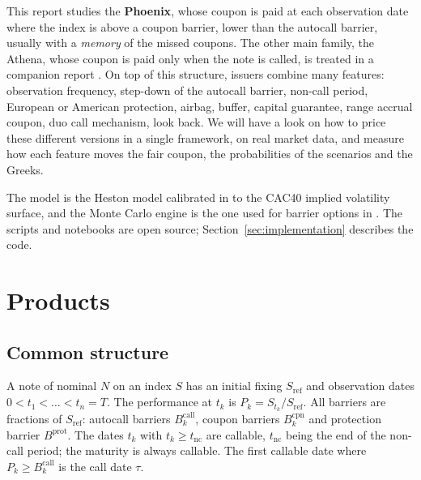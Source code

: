 \documentclass[11pt,a4paper]{article}
\newcommand{\Sref}{S_{\mathrm{ref}}}
\begin{document}
This report studies the \textbf{Phoenix}, whose coupon is paid at each observation date where the index is above a
coupon barrier, lower than the autocall barrier, usually with a \emph{memory} of the missed coupons. The other main
family, the Athena, whose coupon is paid only when the note is called, is treated in a companion report
\cite{benguedda2026athena}.
On top of this structure, issuers combine many features: observation frequency, step-down of the autocall barrier,
non-call period, European or American protection, airbag, buffer, capital guarantee, range accrual coupon, duo call mechanism, look back. We will have a look on how to price
these different versions in a single framework, on real market data, and measure how each feature moves the fair
coupon, the probabilities of the scenarios and the Greeks.

The model is the Heston model calibrated in \cite{benguedda2026heston} to the CAC40 implied volatility surface, and the Monte Carlo engine is the one used for barrier options in \cite{benguedda2026barrier}. The scripts and
notebooks are open source; Section~\ref{sec:implementation} describes the code.

\section{Products}\label{sec:products}

\subsection{Common structure}
A note of nominal $N$ on an index $S$ has an initial fixing $\Sref$ and observation dates
$0 < t_1 < \dots < t_n = T$. The performance at $t_k$ is $P_k = S_{t_k}/\Sref$. All barriers are fractions of
$\Sref$: autocall barriers $B^{\mathrm{call}}_k$, coupon barriers $B^{\mathrm{cpn}}_k$ and protection
barrier $B^{\mathrm{prot}}$. The dates $t_k$ with $t_k \ge t_{\mathrm{nc}}$ are callable, $t_{\mathrm{nc}}$ being the
end of the non-call period; the maturity is always callable. The first callable date where
$P_k \ge B^{\mathrm{call}}_k$ is the call date $\tau$.
\end{document}
